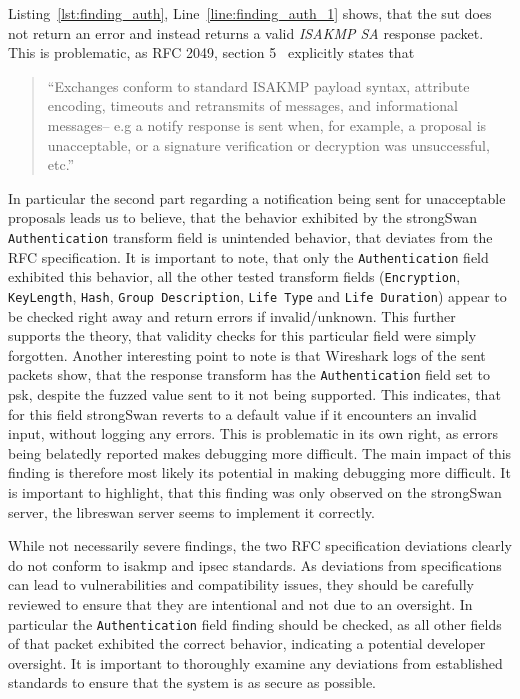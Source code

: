 Listing~\ref{lst:finding_auth}, Line~\ref{line:finding_auth_1} shows, that the \ac{sut} does not return an error and instead returns a valid \emph{ISAKMP SA} response packet. This is problematic, as RFC 2049, section 5~\cite{rfc:ikev1} explicitly states that 

\begin{quotation}
	``Exchanges conform to standard ISAKMP payload syntax, attribute
	encoding, timeouts and retransmits of messages, and informational
	messages-- e.g a notify response is sent when, for example, a
	proposal is unacceptable, or a signature verification or decryption
	was unsuccessful, etc.''
\end{quotation}

In particular the second part regarding a notification being sent for unacceptable proposals leads us to believe, that the behavior exhibited by the strongSwan \texttt{Authentication} transform field is unintended behavior, that deviates from the RFC specification. It is important to note, that only the \texttt{Authentication} field exhibited this behavior, all the other tested transform fields (\texttt{Encryption}, \texttt{KeyLength}, \texttt{Hash}, \texttt{Group Description}, \texttt{Life Type} and \texttt{Life Duration}) appear to be checked right away and return errors if invalid/unknown. This further supports the theory, that validity checks for this particular field were simply forgotten. Another interesting point to note is that Wireshark logs of the sent packets show, that the response transform has the \texttt{Authentication} field set to \ac{psk}, despite the fuzzed value sent to it not being supported. This indicates, that for this field strongSwan reverts to a default value if it encounters an invalid input, without logging any errors. This is problematic in its own right, as errors being belatedly reported makes debugging more difficult. The main impact of this finding is therefore most likely its potential in making debugging more difficult. It is important to highlight, that this finding was only observed on the strongSwan server, the libreswan server seems to implement it correctly.

While not necessarily severe findings, the two RFC specification deviations clearly do not conform to \ac{isakmp} and \ac{ipsec} standards. As deviations from specifications can lead to vulnerabilities and compatibility issues, they should be carefully reviewed to ensure that they are intentional and not due to an oversight. In particular the \texttt{Authentication} field finding should be checked, as all other fields of that packet exhibited the correct behavior, indicating a potential developer oversight. It is important to thoroughly examine any deviations from established standards to ensure that the system is as secure as possible.

